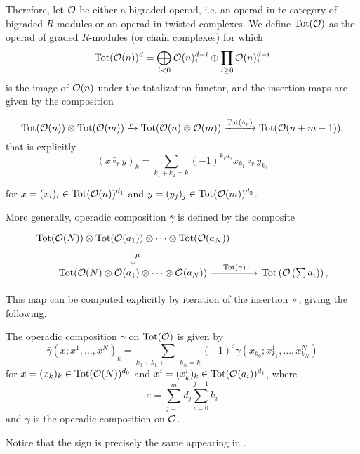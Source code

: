 \documentclass[Thesis.tex]{subfiles}
\begin{document}
Therefore, let ${\mathcal O}$ be either a bigraded operad, i.e. an operad in te category of bigraded $R$-modules or an operad in twisted complexes. We define $\operatorname{Tot}({\mathcal O})$ as the operad of graded $R$-modules (or chain complexes) for which \[\operatorname{Tot}({\mathcal O}(n))^d=\bigoplus_{i<0}{\mathcal O}(n)^{d-i}_i\oplus\prod_{i\geq 0} {\mathcal O}(n)^{d-i}_i\] is the image of ${\mathcal O}(n)$ under the totalization functor, and the insertion maps are given by the composition  

\begin{equation}\label{insertion}
\operatorname{Tot}({\mathcal O}(n))\otimes \operatorname{Tot}({\mathcal O}(m))\xrightarrow{\mu} \operatorname{Tot}({\mathcal O}(n)\otimes {\mathcal O}(m)) \xrightarrow{\operatorname{Tot}(\circ_r)} \operatorname{Tot}({\mathcal O}(n+m-1)),
\end{equation}
that is explicitly 
\[(x\bar{\circ}_ry)_k=\sum_{k_1+k_2=k} (-1)^{k_1d_2} x_{k_1}\circ_r y_{k_2}\]

for $x=(x_i)_i\in \operatorname{Tot}({\mathcal O}(n))^{d_1}$ and $y=(y_j)_j\in \operatorname{Tot}({\mathcal O}(m))^{d_2}$.

More generally, operadic composition $\bar{\gamma}$ is defined by the composite
\[
\begin{tikzcd}
\Tot(\OO(N))\otimes \Tot(\OO(a_1))\otimes\cdots\otimes \Tot(\OO(a_N))\arrow[d, "\mu"]\\
 \Tot(\OO(N)\otimes \OO(a_1)\otimes\cdots\otimes \OO(a_N))\arrow[r, "\Tot(\gamma)"]& \Tot\left(\OO\left(\sum a_i\right)\right),
\end{tikzcd}
\]

This map can be computed explicitly by iteration of the insertion $\bar{\circ}$, giving the following.  %

\begin{lem}\label{totcomp}
The operadic composition $\bar{\gamma}$ on $\operatorname{Tot}({\mathcal O})$ is given by
\begin{equation*}%
\bar{\gamma}(x;x^1,\dots, x^N)_k=\sum_{k_0+k_1+\cdots+k_N=k}(-1)^{\varepsilon}\gamma(x_{k_0};x^1_{k_1},\dots, x^N_{k_N})
\end{equation*}
for $x=(x_k)_k\in\operatorname{Tot}({\mathcal O}(N))^{d_0}$ and $x^i=(x^i_k)_k\in\operatorname{Tot}({\mathcal O}(a_i))^{d_i}$, where 
\begin{equation}
\varepsilon=\sum_{j=1}^m d_j\sum_{i=0}^{j-1}k_i
\end{equation}
and $\gamma$ is the operadic composition on ${\mathcal O}$.
\end{lem}
Notice that the sign is precisely the same appearing in .

\end{document}

